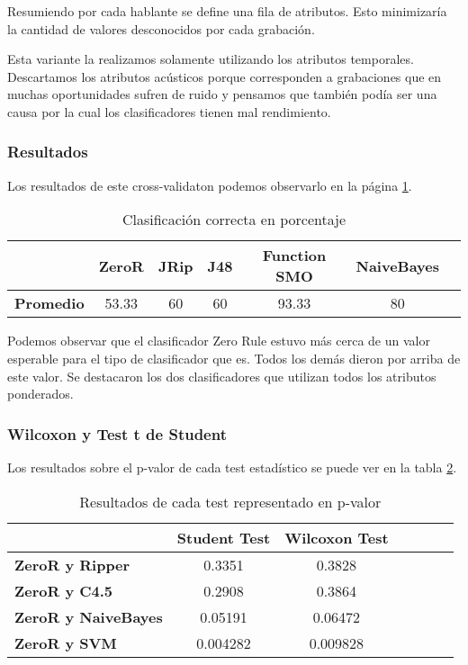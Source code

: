 Resumiendo por cada hablante se define una fila de atributos. Esto minimizaría la cantidad de valores desconocidos por cada grabación.

Esta variante la realizamos solamente utilizando los atributos temporales. Descartamos los atributos acústicos porque corresponden a grabaciones que en muchas oportunidades sufren de ruido y pensamos que también podía ser una causa por la cual los clasificadores tienen mal rendimiento.

\subsubsection{Resultados}

Los resultados de este cross-validaton podemos observarlo en la página \ref{class_corr_en_pct}.

\begin{table}[H]
	\centering
	\begin{tabular}{|l|c|c|c|c|c|c|}
		\hline
		\textbf{}  & \textbf{ZeroR} & \textbf{JRip} & \textbf{J48} & \textbf{Function SMO} & \textbf{NaiveBayes} \\ \hline
		\textbf{Promedio} & 53.33 & 60 & 60 & 93.33 & 80  \\ \hline
	\end{tabular}
	\caption{Clasificación correcta en porcentaje}
	\label{class_corr_en_pct}
\end{table}

Podemos observar que el clasificador Zero Rule estuvo más cerca de un valor esperable para el tipo de clasificador que es. Todos los demás dieron por arriba de este valor. Se destacaron los dos clasificadores que utilizan todos los atributos ponderados.

\subsubsection{Wilcoxon y Test t de Student}

Los resultados sobre el p-valor de cada test estadístico se puede ver en la tabla \ref{res_tests_wilcoxon_student}.

\begin{table}[H]
	\centering
	\begin{tabular}{|l|c|c|c|c|c|c|}
		\hline
		\textbf{}  & \textbf{Student Test} & \textbf{Wilcoxon Test} \\ \hline		
			\textbf{ZeroR y Ripper}  & 0.3351 & 0.3828 \\ \hline
			\textbf{ZeroR y C4.5}  & 0.2908 &  0.3864 \\ \hline
			\textbf{ZeroR y NaiveBayes}  & 0.05191 & 0.06472 \\ \hline
			\textbf{ZeroR y SVM}  &  0.004282 & 0.009828 \\ \hline
	\end{tabular}
	\caption{Resultados de cada test representado en p-valor}
	\label{res_tests_wilcoxon_student}
\end{table}

